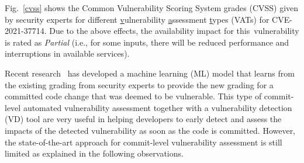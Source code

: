 



Fig.~\ref{cvss} shows the Common Vulnerability Scoring System
grades (CVSS) given by security experts for
different \underline{v}ulnerability \underline{a}ssessment
\underline{t}ypes (VATs) for CVE-2021-37714. Due to the above effects,
the availability impact for this~vulnerability is rated as {\em
  Partial} (i.e., for some inputs, there will be reduced performance
and interruptions in available services).

Recent research~\cite{deepCVA-ase21} has developed a machine learning
(ML) model that learns from the existing grading from security experts
to provide the new grading for a committed code change that was deemed
to be vulnerable. This type of commit-level automated vulnerability
assessment together with a vulnerability detection (VD) tool are very
useful in helping developers to early detect and assess the impacts of
the detected vulnerability as soon as the code is committed.  However,
the state-of-the-art approach for commit-level vulnerability
assessment is still limited as explained in the following
observations.

